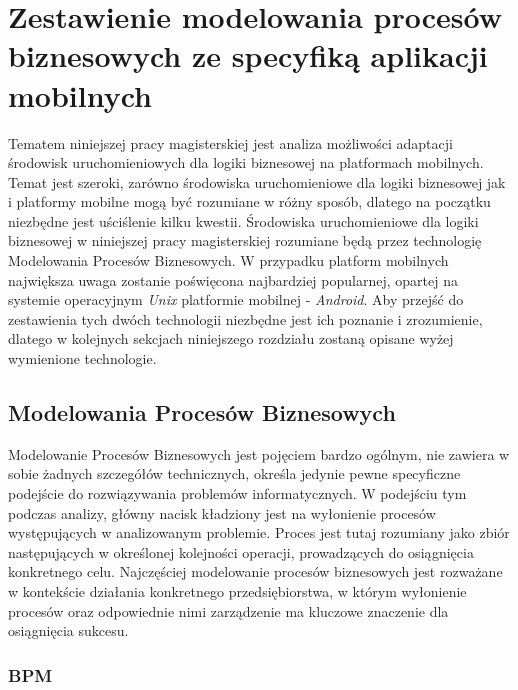 \chapter{Zestawienie modelowania procesów biznesowych ze specyfiką aplikacji mobilnych}
\label{cha:bpmVSMobileApplications}

Tematem niniejszej pracy magisterskiej jest analiza możliwości adaptacji środowisk uruchomieniowych dla logiki biznesowej na platformach mobilnych. Temat jest szeroki, zarówno środowiska uruchomieniowe dla logiki biznesowej jak i platformy mobilne mogą być rozumiane w różny sposób, dlatego na początku niezbędne jest uściślenie kilku kwestii. Środowiska uruchomieniowe dla logiki biznesowej w niniejszej pracy magisterskiej rozumiane będą przez technologię Modelowania Procesów Biznesowych. W przypadku platform mobilnych największa uwaga zostanie poświęcona najbardziej popularnej, opartej na systemie operacyjnym \textit{Unix} platformie mobilnej - \textit{Android}. Aby przejść do zestawienia tych dwóch technologii niezbędne jest ich poznanie i zrozumienie, dlatego w kolejnych sekcjach niniejszego rozdziału zostaną opisane wyżej wymienione technologie.


\section{Modelowania Procesów Biznesowych}
\label{sec:analizaModelowaniaProcesowBiznesowych}

Modelowanie Procesów Biznesowych jest pojęciem bardzo ogólnym, nie zawiera w sobie żadnych szczegółów technicznych, określa jedynie pewne specyficzne podejście do rozwiązywania problemów informatycznych. W podejściu tym podczas analizy, główny nacisk kładziony jest na wyłonienie procesów występujących w analizowanym problemie. Proces jest tutaj rozumiany jako zbiór następujących w określonej kolejności operacji, prowadzących do osiągnięcia konkretnego celu. Najczęściej modelowanie procesów biznesowych jest rozważane w kontekście działania konkretnego przedsiębiorstwa, w którym wyłonienie procesów oraz odpowiednie nimi zarządzenie ma kluczowe znaczenie dla osiągnięcia sukcesu. 

\subsection{BPM}
\label{sec:bpm}


